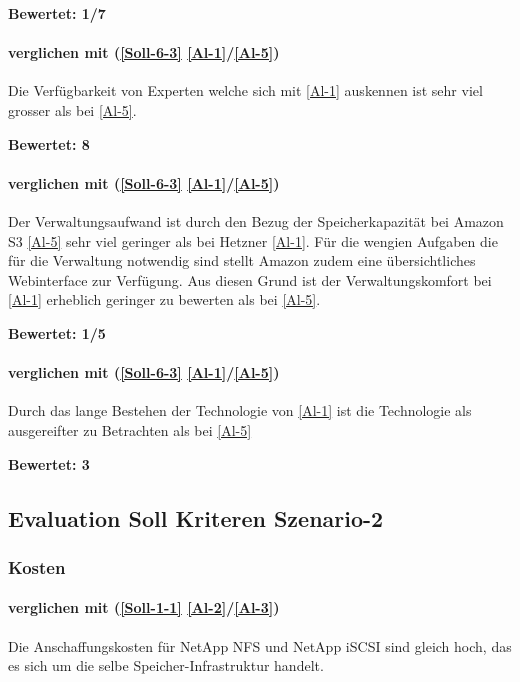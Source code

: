 \textbf{Bewertet: 1/7}

\paragraph*{  verglichen mit  (\ref{Soll-6-3} \ref{Al-1}/\ref{Al-5})} 
Die Verfügbarkeit von Experten welche sich mit \ref{Al-1} auskennen ist sehr viel grosser als bei \ref{Al-5}. 

\textbf{Bewertet: 8}


\paragraph*{  verglichen mit  (\ref{Soll-6-3} \ref{Al-1}/\ref{Al-5})} 
Der Verwaltungsaufwand ist durch den Bezug der Speicherkapazität bei Amazon S3 \ref{Al-5} sehr viel geringer als bei Hetzner \ref{Al-1}. Für die wengien Aufgaben die für die Verwaltung notwendig sind stellt Amazon zudem eine übersichtliches Webinterface zur Verfügung.
Aus diesen Grund ist der Verwaltungskomfort bei \ref{Al-1} erheblich geringer zu bewerten als bei \ref{Al-5}.

\textbf{Bewertet: 1/5}

\paragraph*{  verglichen mit  (\ref{Soll-6-3} \ref{Al-1}/\ref{Al-5})} 
Durch das lange Bestehen der Technologie von \ref{Al-1} ist die Technologie als ausgereifter zu Betrachten als bei \ref{Al-5}

\textbf{Bewertet: 3}


\subsection{Evaluation Soll Kriteren Szenario-2}

\subsubsection{Kosten}

\paragraph*{  verglichen mit  (\ref{Soll-1-1} \ref{Al-2}/\ref{Al-3})}
Die Anschaffungskosten für NetApp NFS und NetApp iSCSI sind gleich hoch, das es sich um die selbe Speicher-Infrastruktur handelt.

